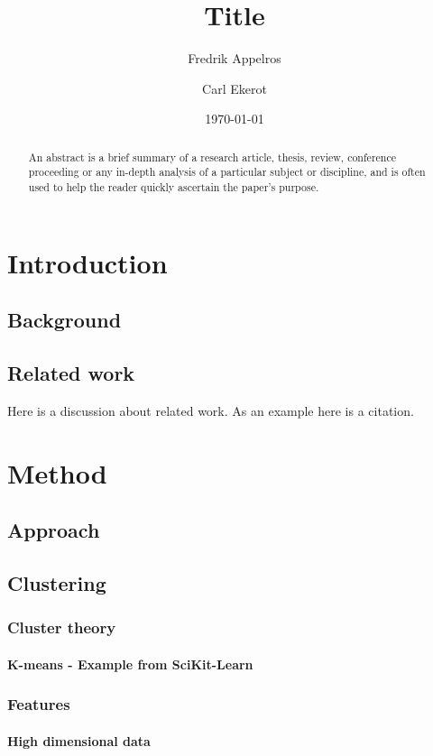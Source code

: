 \documentclass[a4paper]{report}
\begin{document}
\title{Title}
\author{Fredrik Appelros \and Carl Ekerot}
\date{\today}
\maketitle

\begin{abstract}
An abstract is a brief summary of a research article, thesis, review, conference proceeding or any in-depth analysis of a particular subject or discipline, and is often used to help the reader quickly ascertain the paper's purpose.
\end{abstract}

\tableofcontents

\chapter{Introduction}
\section{Background}
\section{Related work}
Here is a discussion about related work. As an example here is a citation\cite{cui07}.
\chapter{Method}
\section{Approach}
\section{Clustering}
\subsection{Cluster theory}
\subsubsection{K-means - Example from SciKit-Learn}
\subsection{Features}
\subsubsection{High dimensional data}
\end{document}

